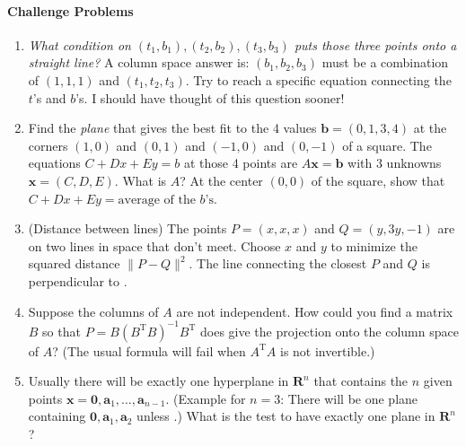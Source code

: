 \documentclass[14pt, a4paper]{article}
\begin{document}
\paragraph{Challenge Problems}
\begin{enumerate}[resume]
    \item \emph{What condition on $(t_1, b_1), (t_2, b_2), (t_3, b_3)$ puts those three points onto a straight line?} A column space answer is: $(b_1, b_2, b_3)$ must be a combination of $(1, 1, 1)$ and $(t_1, t_2, t_3)$. Try to reach a specific equation connecting the $t$'s and $b$'s. I should have thought of this question sooner!

    \item Find the \emph{plane} that gives the best fit to the 4 values $\boldsymbol{b} = (0, 1, 3, 4)$ at the corners $(1, 0)$ and $(0, 1)$ and $(-1, 0)$ and $(0, -1)$ of a square. The equations $C + Dx + Ey = b$ at those 4 points are $A\boldsymbol{x} = \boldsymbol{b}$ with 3 unknowns $\boldsymbol{x} = (C, D, E)$. What is $A$? At the center $(0, 0)$ of the square, show that $C + Dx + Ey = \text{average of the } b\text{'s}$.

    \item (Distance between lines) The points $P = (x, x, x)$ and $Q = (y, 3y, -1)$ are on two lines in space that don't meet. Choose $x$ and $y$ to minimize the squared distance $\|P - Q\|^2$. The line connecting the closest $P$ and $Q$ is perpendicular to \underline{\hspace{2cm}}.

    \item Suppose the columns of $A$ are not independent. How could you find a matrix $B$ so that $P = B(B^{\mathrm{T}}B)^{-1}B^{\mathrm{T}}$ does give the projection onto the column space of $A$? (The usual formula will fail when $A^{\mathrm{T}}A$ is not invertible.)

    \item Usually there will be exactly one hyperplane in $\mathbf{R}^n$ that contains the $n$ given points $\boldsymbol{x} = \mathbf{0}, \boldsymbol{a}_1, \dots, \boldsymbol{a}_{n-1}$. (Example for $n = 3$: There will be one plane containing $\mathbf{0}, \boldsymbol{a}_1, \boldsymbol{a}_2$ unless \underline{\hspace{2cm}}.) What is the test to have exactly one plane in $\mathbf{R}^n$?


\end{enumerate}
\end{document}
